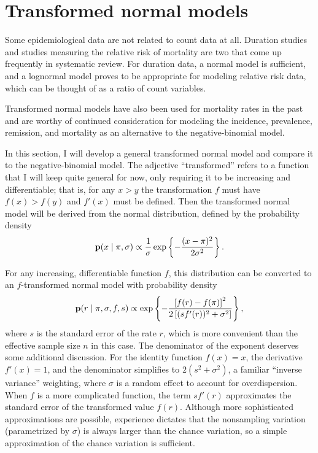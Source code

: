 \section{Transformed normal models}
\label{transformed-normal-models}
Some epidemiological data are not related to count data at all.
Duration studies and studies measuring the relative risk of mortality
are two that come up frequently in systematic review.  For duration
data, a normal model is sufficient, and a lognormal model proves to
be appropriate for modeling relative risk data, which can be thought
of as a ratio of count variables.

Transformed normal models have also been used for mortality rates in
the
past\cite{girosi_demographic_2008,hogan_maternal_2010,rajaratnam_neonatal_2010}
and are worthy of continued consideration for modeling the incidence,
prevalence, remission, and mortality as an alternative to the
negative-binomial model.

In this section, I will develop a general transformed normal model
and compare it to the negative-binomial model.  The adjective
``transformed'' refers to a function that I will keep quite general
for now, only requiring it to be increasing and differentiable;
that is, for any $x > y$ the transformation $f$ must have $f(x) > f(y)$
and $f'(x)$ must be defined.  Then the transformed normal model will
be derived from the normal distribution, defined by the probability
density
\[
\mathbf{p}(x\;|\; \pi, \sigma)
 \propto \frac{1}{\sigma}
\exp\left\{ -\frac{(x-\pi)^2}{2\sigma^2} \right\}.
\]

For any increasing, differentiable function $f$, this distribution can
be converted to an $f$-transformed normal model with probability
density
\[
\mathbf{p}(r \;|\; \pi, \sigma, f, s) \propto
\exp\left\{-\frac{\left[f(r)-f(\pi)\right]^2}{2\left[(sf'(r))^2+\sigma^2\right]}\right\},
\]
where $s$ is the standard error of the rate $r$, which is more
convenient than the effective sample size $n$ in this case. The
denominator of the exponent deserves some additional discussion.  For
the identity function $f(x) = x$, the derivative $f'(x) = 1$, and the
denominator simplifies to $2(s^2 + \sigma^2)$, a familiar ``inverse
variance'' weighting, where $\sigma$ is a random effect to account for
overdispersion.  When $f$ is a more complicated function, the term
$sf'(r)$ approximates the standard error of the transformed value
$f(r)$.  Although more sophisticated approximations are possible,
experience dictates that the nonsampling variation (parametrized by
$\sigma$) is always larger than the chance variation, so a simple
approximation of the chance variation is sufficient.

